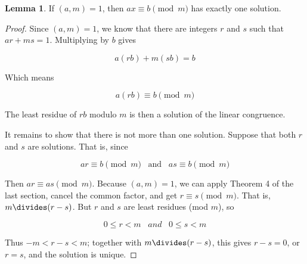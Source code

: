 \documentclass{article}
\theoremstyle{definition} %
\theoremstyle{definition}
\theoremstyle{definition}
\newtheorem{lemma}{Lemma}[section]
\theoremstyle{definition}
\begin{document}
  \begin{lemma}
    If $(a, m) = 1$, then $ax \equiv b \pmod{m}$ has exactly one solution.
  \end{lemma}
  
  \begin{proof}
    Since $(a, m) = 1$, we know that there are integers $r$ and $s$ such that $ar + ms = 1$.
    Multiplying by $b$ gives
    
    \[ a(rb) + m(sb) = b \]
    
    Which means
    
    \[ a(rb) \equiv b \pmod{m} \]
    
    The least residue of $rb$ modulo $m$ is then a solution of the linear congruence.
    
    It remains to show that there is not more than one solution. Suppose that both $r$ and $s$
    are solutions. That is, since
    
    \[ ar \equiv b \pmod{m} \;\;\;\text{and}\;\;\; as \equiv b \pmod{m} \]
    
    Then $ar \equiv as \pmod{m}$. Because $(a, m) = 1$, we can apply Theorem 4 of the last section,
    cancel the common factor, and get $r \equiv s \pmod{m}$. That is, $m \divides (r - s)$. But $r$
    and $s$ are least residues (mod $m$), so
    
    \[ 0 \leq r < m \;\;\;and\;\;\; 0 \leq s < m \]
    
    Thus $-m < r - s < m$; together with $m \divides (r - s)$, this gives $r - s = 0$, or $r = s$, and
    the solution is unique.
    
  \end{proof}
  
\end{document}
